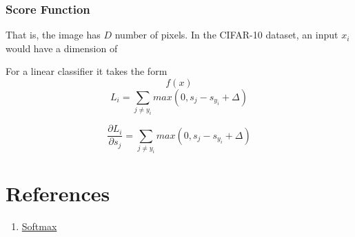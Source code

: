 \documentclass[12pt]{article}
\begin{document}
\subsubsection*{Score Function}
That is, the image has $D$ number of pixels. In the CIFAR-10 dataset, an input $x_i$ would have a dimension of   

For a linear classifier it takes the form \[f(x) \]
\[ 
L_i = \sum_{j \ne y_i} max(0, s_j - s_{y_i} + \Delta) 
\]

\[ 
\frac{\partial L_i}{\partial s_j} = 
\sum_{j \ne y_i} max(0, s_j - s_{y_i} + \Delta) 
\]

\section{References}
\begin{enumerate}
    \item \href{https://cs231n.github.io/linear-classify/#softmax-classifier}{Softmax}
\end{enumerate}
\end{document}
